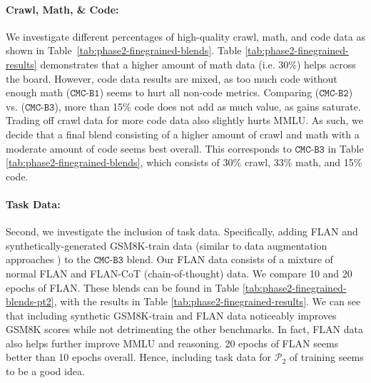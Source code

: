 \documentclass[11pt]{article}
\newcommand{\steven}[1]{\textcolor{magenta}{\bf\small [Steven: #1]}\xspace}
\newcommand{\phasetwo}{$\mathcal{P}_2$\xspace}
\begin{document}
\paragraph{Crawl, Math, \& Code:} We investigate different percentages of high-quality crawl, math, and code data as shown in Table~\ref{tab:phase2-finegrained-blends}. 
Table \ref{tab:phase2-finegrained-results} demonstrates that a higher amount of math data (i.e. 30\%) helps across the board. 
However, code data results are mixed, as too much code without enough math ($\mathtt{CMC}$-$\mathtt{B1}$) seems to hurt all non-code metrics. Comparing ($\mathtt{CMC}$-$\mathtt{B2}$) vs. ($\mathtt{CMC}$-$\mathtt{B3}$), more than 15\% code does not add as much value, as gains saturate. Trading off crawl data for more code data also slightly hurts MMLU. %
As such, we decide that a final blend consisting of a higher amount of crawl and math with a moderate amount of code seems best overall. This corresponds to $\mathtt{CMC}$-$\mathtt{B3}$ in Table \ref{tab:phase2-finegrained-blends}, which consists of 30\% crawl, 33\% math, and 15\% code. 

\paragraph{Task Data:} Second, we investigate the inclusion of task data. Specifically, adding FLAN and synthetically-generated GSM8K-train data (similar to data augmentation approaches \cite{feng-etal-2021-survey}) to the $\mathtt{CMC}$-$\mathtt{B3}$ blend. 
Our FLAN data consists of a mixture of normal FLAN and FLAN-CoT (chain-of-thought) data. 
We compare 10 and 20 epochs of FLAN. 
These blends can be found in Table \ref{tab:phase2-finegrained-blends-pt2}, with the results in Table \ref{tab:phase2-finegrained-results}. We can see that including synthetic GSM8K-train and FLAN data noticeably improves GSM8K scores while not detrimenting the other benchmarks. In fact, FLAN data also helps further improve MMLU and reasoning. 20 epochs of FLAN seems better than 10 epochs overall. Hence, including task data for \phasetwo of training seems to be a good idea.
\end{document}
